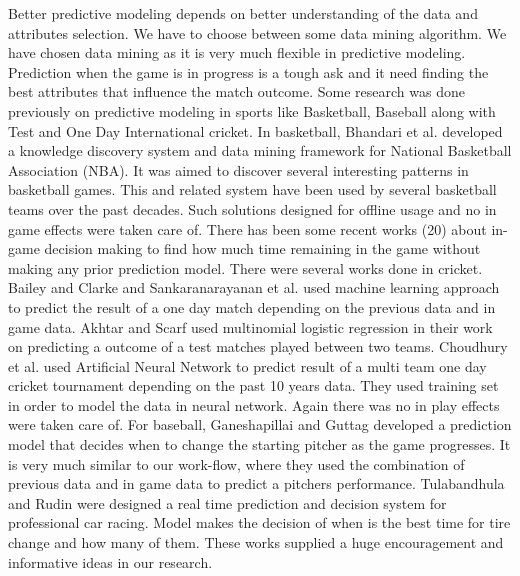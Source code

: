 Better predictive modeling depends on better understanding of the data and attributes selection. We have to choose between some data mining algorithm. We have chosen data mining as it is very much flexible in predictive modeling. Prediction when the game is in progress is a tough ask and it need finding the best attributes that influence the match outcome. Some research was done previously on predictive modeling in sports like Basketball, Baseball along with Test and One Day International cricket.
In basketball, Bhandari et al.\cite{Bhandari1997} developed a knowledge discovery system and data mining framework for National Basketball Association (NBA). It was aimed to discover several interesting patterns in basketball games. This and related system have been used by several basketball teams over the past decades. Such solutions designed for offline usage and no in game effects were taken care of. There has been some recent works (20) about in-game decision making to find how much time remaining in the game without making any prior prediction model.
There were several works done in cricket. Bailey and Clarke\cite{Bailey} and Sankaranarayanan et al.\cite{Sankaranarayanan} used machine learning approach to predict the result of a one day match depending on the previous data and in game data.
Akhtar and Scarf\cite{Akhtar} used multinomial logistic regression in their work on predicting a outcome of a test matches played between two teams.
Choudhury et al.\cite{Choudhury} used Artificial Neural Network to predict result of a multi team one day cricket tournament depending on the past 10 years data. They used training set in order to model the data in neural network. Again there was no in play effects were taken care of.
For baseball, Ganeshapillai and Guttag\cite{Ganeshapillai} developed a prediction model that decides when to change the starting pitcher as the game progresses. It is very much similar to our work-flow, where they used the combination of previous data and in game data to predict a pitchers performance.
Tulabandhula and Rudin\cite{Tulabandhula} were designed a real time prediction and decision system for professional car racing. Model makes the decision of when is the best time for tire change and how many of them. These works supplied a huge encouragement and informative ideas in our research.
